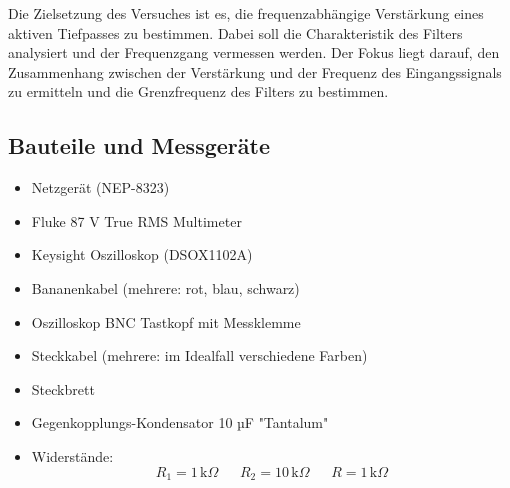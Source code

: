 \documentclass[a4paper,12pt]{article}
\begin{document}
Die Zielsetzung des Versuches ist es, die frequenzabhängige Verstärkung eines aktiven Tiefpasses zu bestimmen. Dabei soll die Charakteristik des Filters analysiert und der Frequenzgang vermessen werden. Der Fokus liegt darauf, den Zusammenhang zwischen der Verstärkung und der Frequenz des Eingangssignals zu ermitteln und die Grenzfrequenz des Filters zu bestimmen.
\subsection{Bauteile und Messgeräte}
\begin{itemize}

\item Netzgerät (NEP-8323)
\item Fluke 87 V True RMS Multimeter
\item Keysight Oszilloskop (DSOX1102A)
\item Bananenkabel (mehrere: rot, blau, schwarz)
\item Oszilloskop BNC Tastkopf mit Messklemme
\item Steckkabel (mehrere: im Idealfall verschiedene Farben)
\item Steckbrett
\item Gegenkopplungs-Kondensator 10 µF "Tantalum"
\item Widerstände:
\[
 R_{1} = 1 \, \text{k}\Omega~~~~~~~R_{2} = 10 \, \text{k}\Omega~~~~~~~R = 1 \, \text{k}\Omega
\]
\end{itemize}
\end{document}
